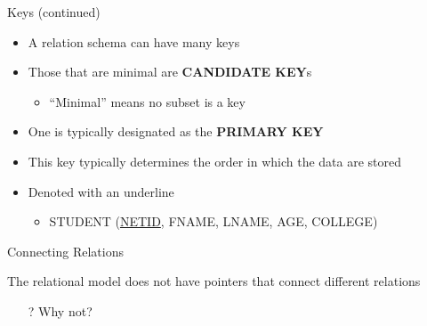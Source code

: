 \documentclass[aspectratio=169]{beamer}
\begin{document}
\begin{frame}{Keys (continued)}

\begin{itemize}
\item A relation schema can have many keys
\item Those that are minimal are \textbf{CANDIDATE KEY}s
	\begin{itemize}
	\item ``Minimal'' means no subset is a key
	\end{itemize}
\item One is typically designated as the \textbf{PRIMARY KEY} 
\item This key typically determines the order in which the data are stored 
\item Denoted with an underline
	\begin{itemize}
	\item STUDENT (\underline{NETID}, FNAME, LNAME, AGE, COLLEGE)
	\end{itemize}
\end{itemize}
\end{frame}

\begin{frame}{Connecting Relations}

The relational model does not have pointers that connect different relations\\
\vspace{1em}
\begin{itemize}
\item[?] Why not? 
\end{itemize}

\end{frame}
\end{document}
